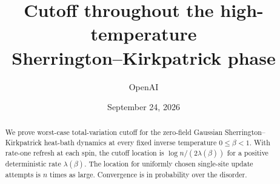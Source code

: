 \documentclass[11pt]{article}
\title{Cutoff throughout the high-temperature\\
  Sherrington--Kirkpatrick phase}
\author{OpenAI}
\date{September 24, 2026}
\begin{document}
\maketitle
\begin{abstract}
We prove worst-case total-variation cutoff for the zero-field Gaussian
Sherrington--Kirkpatrick heat-bath dynamics at every fixed inverse
temperature \(0\leq\beta<1\).
With rate-one refresh at each spin, the cutoff location is
\(\log n/(2\lambda(\beta))\) for a positive deterministic rate
\(\lambda(\beta)\). The location for uniformly chosen single-site
update attempts is \(n\) times as large. Convergence is in probability
over the disorder.
\end{abstract}
\tableofcontents









\appendix











\end{document}
